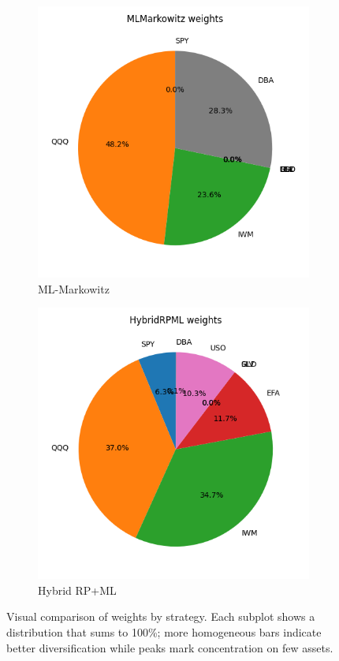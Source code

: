 \documentclass[11pt,a4paper]{article}
\begin{document}
\begin{figure}[h]
  \vspace{0.5em}
  \begin{subfigure}[b]{0.48\textwidth}
    \centering
    \includegraphics[width=\linewidth]{../../figures/MLMarkowitz_weights_generated.png}
    \caption{ML-Markowitz}
  \end{subfigure}
  \hfill
  \begin{subfigure}[b]{0.48\textwidth}
    \centering
    \includegraphics[width=\linewidth]{../../figures/HybridRPML_weights_generated.png}
    \caption{Hybrid RP+ML}
  \end{subfigure}
  \caption{Visual comparison of weights by strategy. Each subplot shows a distribution that sums to 100\%; more homogeneous bars indicate better diversification while peaks mark concentration on few assets.}
  \label{fig:weights_external}
\end{figure}
\end{document}

